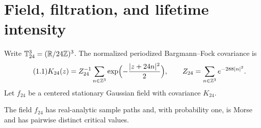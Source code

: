 \section{Field, filtration, and lifetime intensity}\label{sec:field}

Write $\mathbb T_{24}^3=(\mathbb R/24\mathbb Z)^3$. The normalized periodized Bargmann--Fock covariance is
\begin{equation}\tag{1.1}\label{eq:K24}
K_{24}(z)=Z_{24}^{-1}\sum_{n\in\mathbb Z^3}\exp\Bigl(-\frac{|z+24n|^2}{2}\Bigr),\qquad Z_{24}=\sum_{n\in\mathbb Z^3}e^{-288|n|^2}.
\end{equation}
Let $f_{24}$ be a centered stationary Gaussian field with covariance $K_{24}$.

\begin{proposition}\label{prop:generic}
The field $f_{24}$ has real-analytic sample paths and, with probability one, is Morse and has pairwise distinct critical values.
\end{proposition}


